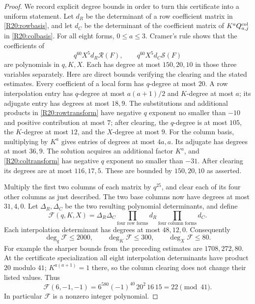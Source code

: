 \begin{proof}
We record explicit degree bounds in order to turn this certificate
into a uniform statement. Let $d_R$ be the determinant of a row
coefficient matrix in \eqref{R20:rowbasis}, and let $d_C$ be the
determinant of the coefficient matrix of
$K^a Q^{\rm col}_{a,j}$ in \eqref{R20:colbasis}.
For all eight forms, $0\leq a\leq3$. Cramer's rule shows that
the coefficients of
\[
 q^{60}X^5d_R\mathcal R(F),\qquad
 q^{60}X^5d_C\mathcal S(F)
\]
are polynomials in $q,K,X$. Each has degree at most
$150,20,10$ in those three variables separately. Here are direct
bounds verifying the clearing and the stated estimates.
Every coefficient of a local form has $q$-degree at most $20$.
A row interpolation entry has $q$-degree at most $a(a+1)/2$
and $K$-degree at most $a$; its adjugate entry has degrees at most
$18,9$. The substitutions and additional products in
\eqref{R20:rowtransform} have negative $q$ exponent no smaller
than $-10$ and positive contribution at most $7$; after clearing,
the $q$-degree is at most $105$, the $K$-degree at most $12$,
and the $X$-degree at most $9$.
For the column basis, multiplying by $K^a$ gives entries of degrees
at most $4a,a$. Its adjugate has degrees at most $36,9$.
The solution acquires an additional factor $K^a$, and
\eqref{R20:coltransform} has negative $q$ exponent no smaller than
$-31$. After clearing its degrees are at most $116,17,5$.
These are bounded by $150,20,10$ as asserted.

Multiply the first two columns of each matrix by $q^{25}$,
and clear each of its four other columns as just described.
The two base columns now have degrees at most $31,4,0$.
Let $\Delta_R,\Delta_C$ be the two resulting polynomial determinants,
and define
\[
 \mathscr F(q,K,X)=\Delta_R\Delta_C
                  \prod_{\text{four row forms}}d_R
                  \prod_{\text{four column forms}}d_C.
\]
Each interpolation determinant has degrees at most $48,12,0$.
Consequently
\begin{equation}\label{R20:degrees}
 \deg_q\mathscr F\leq2000,\qquad
 \deg_K\mathscr F\leq300,\qquad
 \deg_X\mathscr F\leq80.
\end{equation}
For example the sharper bounds from the preceding estimates are
$1708,272,80$. At the certificate specialization all eight
interpolation determinants have product $20$ modulo $41$;
$K^{a(a+1)}=1$ there, so the column clearing does not change their
listed values. Thus
\[
 \mathscr F(6,-1,-1)
 =6^{580}(-1)^{40}\,20^2\,16\,15=22\pmod{41}.
\]
In particular $\mathscr F$ is a nonzero integer polynomial.


\end{proof}
